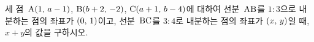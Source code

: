 세 점~$\mathrm{A}(1,\mkern3mu a-1)$, $\mathrm{B}(b+2,\mkern3mu -2)$, $\mathrm{C}(a+1,\mkern3mu b-4)$에 대하여 선분~$\mathrm{AB}$를 $1:3$으로 내분하는 점의 좌표가 $(0,\mkern3mu 1)$이고, 선분~$\mathrm{BC}$를 $3:4$로 내분하는 점의 좌표가 $(x,\mkern3mu y)$일 때, $x+y$의 값을 구하시오.
